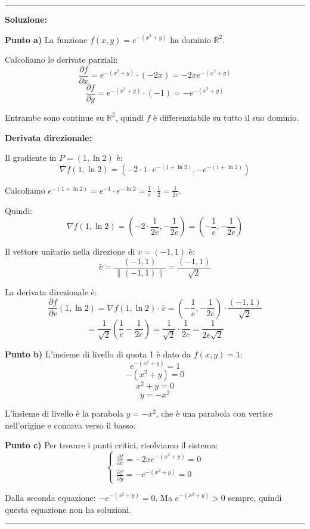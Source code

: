 \documentclass[12pt, a4paper]{article}
\newenvironment{solution}
{\par\noindent\rule{\textwidth}{0.4pt}\par\textbf{Soluzione:}\medskip\par}
{\par\rule{\textwidth}{0.4pt}\par\bigskip}
\begin{document}
\begin{solution}
\textbf{Punto a)} La funzione $f(x,y) = e^{-(x^{2}+y)}$ ha dominio $\mathbb{R}^2$.

Calcoliamo le derivate parziali:
\[
\frac{\partial f}{\partial x} = e^{-(x^{2}+y)} \cdot (-2x) = -2xe^{-(x^{2}+y)}
\]
\[
\frac{\partial f}{\partial y} = e^{-(x^{2}+y)} \cdot (-1) = -e^{-(x^{2}+y)}
\]

Entrambe sono continue su $\mathbb{R}^2$, quindi $f$ è differenziabile su tutto il suo dominio.

\textbf{Derivata direzionale:}

Il gradiente in $P = (1, \ln 2)$ è:
\[
\nabla f(1, \ln 2) = (-2 \cdot 1 \cdot e^{-(1 + \ln 2)}, -e^{-(1 + \ln 2)})
\]

Calcoliamo $e^{-(1 + \ln 2)} = e^{-1} \cdot e^{-\ln 2} = \frac{1}{e} \cdot \frac{1}{2} = \frac{1}{2e}$.

Quindi:
\[
\nabla f(1, \ln 2) = \left(-2 \cdot \frac{1}{2e}, -\frac{1}{2e}\right) = \left(-\frac{1}{e}, -\frac{1}{2e}\right)
\]

Il vettore unitario nella direzione di $v = (-1,1)$ è:
\[
\hat{v} = \frac{(-1,1)}{\|(-1,1)\|} = \frac{(-1,1)}{\sqrt{2}}
\]

La derivata direzionale è:
\[
\frac{\partial f}{\partial v}(1, \ln 2) = \nabla f(1, \ln 2) \cdot \hat{v} = \left(-\frac{1}{e}, -\frac{1}{2e}\right) \cdot \frac{(-1,1)}{\sqrt{2}}
\]
\[
= \frac{1}{\sqrt{2}} \left(\frac{1}{e} - \frac{1}{2e}\right) = \frac{1}{\sqrt{2}} \cdot \frac{1}{2e} = \frac{1}{2e\sqrt{2}}
\]

\vspace{0.5cm}

\textbf{Punto b)} L'insieme di livello di quota 1 è dato da $f(x,y) = 1$:
\[
e^{-(x^{2}+y)} = 1
\]
\[
-(x^{2}+y) = 0
\]
\[
x^{2}+y = 0
\]
\[
y = -x^{2}
\]

L'insieme di livello è la parabola $y = -x^2$, che è una parabola con vertice nell'origine e concava verso il basso.

\vspace{0.5cm}

\textbf{Punto c)} Per trovare i punti critici, risolviamo il sistema:
\[
\begin{cases}
\frac{\partial f}{\partial x} = -2xe^{-(x^{2}+y)} = 0 \\
\frac{\partial f}{\partial y} = -e^{-(x^{2}+y)} = 0
\end{cases}
\]

Dalla seconda equazione: $-e^{-(x^{2}+y)} = 0$. Ma $e^{-(x^{2}+y)} > 0$ sempre, quindi questa equazione non ha soluzioni.


\end{solution}
\end{document}
